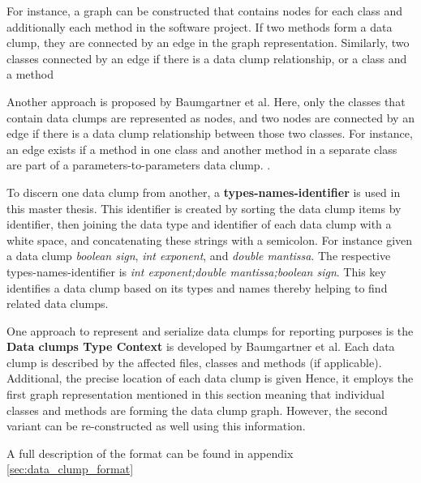 For instance, a graph can be constructed that contains nodes for each class and additionally each method in the software project. If two methods form a data clump, they are connected by an edge in the graph representation. Similarly, two classes connected by an edge if there is a data clump relationship, or a class and a method   

Another approach is proposed by Baumgartner et al. Here, only the classes that contain data clumps are represented as nodes, and two nodes are connected by an edge if there is a data clump relationship between those two classes. For instance, an edge exists if a method in one class and another method in a separate class are part of a parameters-to-parameters data clump. \cite{data_clumps_baumgartner}.


To discern one data clump from another, a \textbf{types-names-identifier} is used in this master thesis. This identifier is created by sorting the data clump items by identifier, then joining the data type and identifier of each data clump with a white space, and concatenating these strings with a semicolon. For instance given a data clump \textit{boolean sign}, \textit{int exponent}, and \textit{double mantissa}. The respective types-names-identifier is \textit{int exponent;double mantissa;boolean sign}. This key identifies a data clump based on its types and names thereby helping to find related data clumps. 



One approach to represent and serialize data clumps for reporting purposes is the \textbf{Data clumps Type Context} \cite{dataclump_type_context} is developed by Baumgartner et al. Each data clump is described by the affected files, classes and methods (if applicable). Additional, the precise location of each data clump is given Hence,  it employs the first graph representation mentioned in this section meaning that individual classes and methods are forming the data clump graph. However, the second variant can be re-constructed as well using this information. 

A full description of the format can be found in appendix \ref{sec:data_clump_format}





